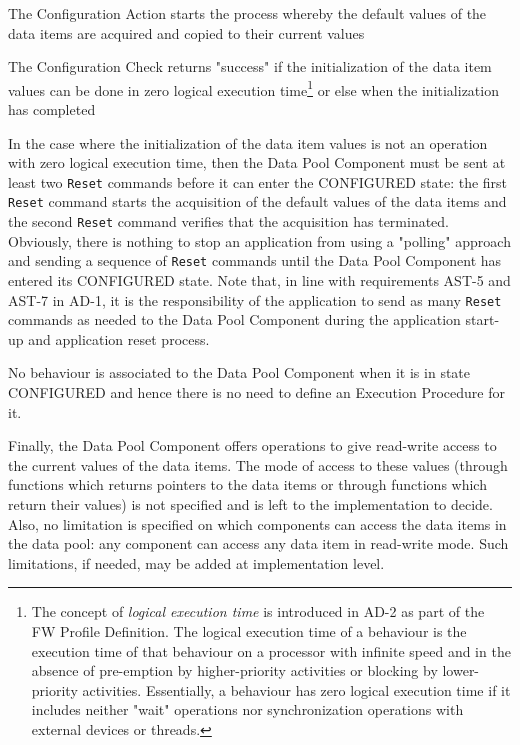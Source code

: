 \documentclass[a4paper,10pt]{article}
\newenvironment{fw_itemize}						%
{\begin{itemize}
  \setlength{\itemsep}{1mm}
  \setlength{\parskip}{0pt}
  \setlength{\parsep}{0pt}}
{\end{itemize}}
\begin{document}
\begin{fw_itemize}
\item The Configuration Action starts the process whereby the default values of the data items are acquired and copied to their current values
\item The Configuration Check returns "success" if the initialization of the data item values can be done in zero logical execution time\footnote{The concept of \textit{logical execution time} is introduced in AD-2 as part of the FW Profile Definition. The logical execution time of a behaviour is the execution time of that behaviour on a processor with infinite speed and in the absence of pre-emption by higher-priority activities or blocking by lower-priority activities. Essentially, a behaviour has zero logical execution time if it includes neither "wait" operations nor synchronization operations with external devices or threads.} or else when the initialization has completed 
\end{fw_itemize}

In the case where the initialization of the data item values is not an operation with zero logical execution time, then the Data Pool Component must be sent at least two \texttt{Reset} commands before it can enter the CONFIGURED state: the first \texttt{Reset} command starts the acquisition of the default values of the data items and the second \texttt{Reset} command verifies that the acquisition has terminated. Obviously, there is nothing to stop an application from using a "polling" approach and sending a sequence of \texttt{Reset} commands until the Data Pool Component has entered its CONFIGURED state. Note that, in line with requirements AST-5 and AST-7 in AD-1, it is the responsibility of the application to send as many \texttt{Reset} commands as needed to the Data Pool Component during the application start-up and application reset process.

No behaviour is associated to the Data Pool Component when it is in state CONFIGURED and hence there is no need to define an Execution Procedure for it.

Finally, the Data Pool Component offers operations to give read-write access to the current values of the data items. The mode of access to these values (through functions which returns pointers to the data items or through functions which return their values) is not specified and is left to the implementation to decide. Also, no limitation is specified on which components can access the data items in the data pool: any component can access any data item in read-write mode. Such limitations, if needed, may be added at implementation level. 
\end{document}

